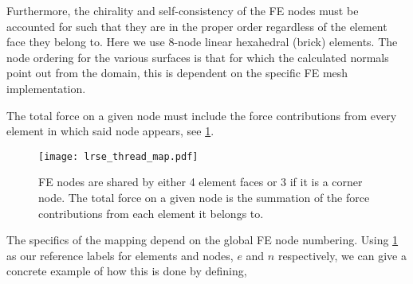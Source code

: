 Furthermore, the chirality and self-consistency of the FE nodes must be accounted for such that they are in the proper order regardless of the element face they belong to. Here we use 8-node linear hexahedral (brick) elements. The node ordering for the various surfaces is that for which the calculated normals point out from the domain, this is dependent on the specific FE mesh implementation.

The total force on a given node must include the force contributions from every element in which said node appears, see \cref{f:shared_node}.
\begin{figure}
  \centering
  \texttt{[image: lrse\_thread\_map.pdf]}
  \caption[FE nodes are shared between surface elements.]{FE nodes are shared by either 4 element faces or 3 if it is a corner node. The total force on a given node is the summation of the force contributions from each element it belongs to.}
  \label{f:shared_node}
\end{figure}
The specifics of the mapping depend on the global FE node numbering. Using \cref{f:shared_node} as our reference labels for elements and nodes, $e$ and $n$ respectively, we can give a concrete example of how this is done by defining,
